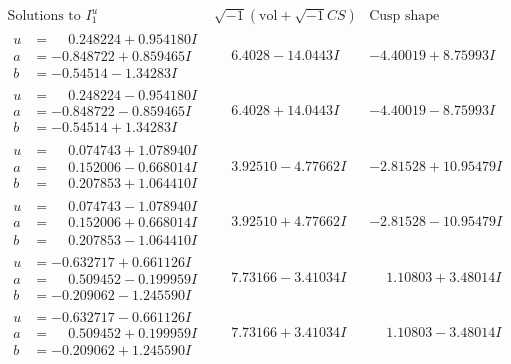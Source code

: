 \documentclass[1p]{elsarticle_modified}
\theoremstyle{definition}
\newcommand{\I}{\sqrt{-1}}
\begin{document}
$$\begin{array}{c|c|c}  
\text{Solutions to }I^u_{1}& \I (\text{vol} + \sqrt{-1}CS) & \text{Cusp shape}\\
 \hline 
\begin{aligned}
u &= \phantom{-}0.248224 + 0.954180 I \\
a &= -0.848722 + 0.859465 I \\
b &= -0.54514 - 1.34283 I\end{aligned}
 & \phantom{-}6.4028 - 14.0443 I & -4.40019 + 8.75993 I \\ \hline\begin{aligned}
u &= \phantom{-}0.248224 - 0.954180 I \\
a &= -0.848722 - 0.859465 I \\
b &= -0.54514 + 1.34283 I\end{aligned}
 & \phantom{-}6.4028 + 14.0443 I & -4.40019 - 8.75993 I \\ \hline\begin{aligned}
u &= \phantom{-}0.074743 + 1.078940 I \\
a &= \phantom{-}0.152006 - 0.668014 I \\
b &= \phantom{-}0.207853 + 1.064410 I\end{aligned}
 & \phantom{-}3.92510 - 4.77662 I & -2.81528 + 10.95479 I \\ \hline\begin{aligned}
u &= \phantom{-}0.074743 - 1.078940 I \\
a &= \phantom{-}0.152006 + 0.668014 I \\
b &= \phantom{-}0.207853 - 1.064410 I\end{aligned}
 & \phantom{-}3.92510 + 4.77662 I & -2.81528 - 10.95479 I \\ \hline\begin{aligned}
u &= -0.632717 + 0.661126 I \\
a &= \phantom{-}0.509452 - 0.199959 I \\
b &= -0.209062 - 1.245590 I\end{aligned}
 & \phantom{-}7.73166 - 3.41034 I & \phantom{-}1.10803 + 3.48014 I \\ \hline\begin{aligned}
u &= -0.632717 - 0.661126 I \\
a &= \phantom{-}0.509452 + 0.199959 I \\
b &= -0.209062 + 1.245590 I\end{aligned}
 & \phantom{-}7.73166 + 3.41034 I & \phantom{-}1.10803 - 3.48014 I \\ \hline\begin{aligned}

\end{aligned}
\end{array}$$
\end{document}

